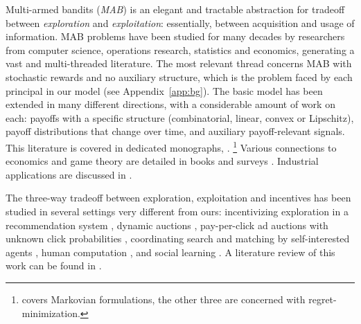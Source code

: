
 Multi-armed bandits (\emph{MAB}) is an elegant and tractable abstraction for tradeoff between \emph{exploration} and \emph{exploitation}: essentially, between acquisition and usage of information. MAB problems have been studied for many decades by researchers from computer science, operations research, statistics and economics, generating a vast and multi-threaded literature.  The most relevant thread concerns MAB with stochastic rewards and no auxiliary structure, which is the problem faced by each principal in our model (see Appendix~\ref{app:bg}). The basic model has been extended in many different directions, with a considerable amount of work on each: \eg payoffs with a specific structure (\eg combinatorial, linear, convex or Lipschitz), payoff distributions that change over time, and auxiliary payoff-relevant signals. This literature is covered in dedicated monographs,
\citep{Gittins-book11,Bubeck-survey12,slivkins-MABbook,LS19bandit-book}.%
\footnote{\citet{Gittins-book11} covers Markovian formulations, the other three are concerned with regret-minimization.}
Various connections to economics and game theory are detailed in 
books \citep{CesaBL-book,slivkins-MABbook} and surveys \citep{Bergemann-survey06,Horner-survey16}. Industrial applications are discussed in \citep{DS-arxiv}.

The three-way tradeoff between exploration, exploitation and incentives has been studied in several settings very different from ours:
incentivizing exploration in a recommendation system
    \citep[\eg][]{Che-13,Frazier-ec14,Kremer-JPE14,ICexploration-ec15,Bimpikis-exploration-ms17,Bahar-ec16,Jieming-unbiased18},
dynamic auctions
    \citep[\eg][]{AtheySegal-econometrica13,DynPivot-econometrica10,Kakade-pivot-or13},
pay-per-click ad auctions with unknown click probabilities
    \citep[\eg][]{MechMAB-ec09,DevanurK09,Transform-ec10-jacm},
coordinating search and matching by self-interested agents
    \citep{Bobby-Glen-ec16},
human computation
    \citep[\eg][]{RepeatedPA-ec14,Ghosh-itcs13,Krause-www13},
and social learning 
    \citep[\eg][]{Bolton-econometrica99,Keller-econometrica05,Johari-ec12}. 
A literature review of this work can be found in 
\citep[Ch. 11.6]{slivkins-MABbook}.


